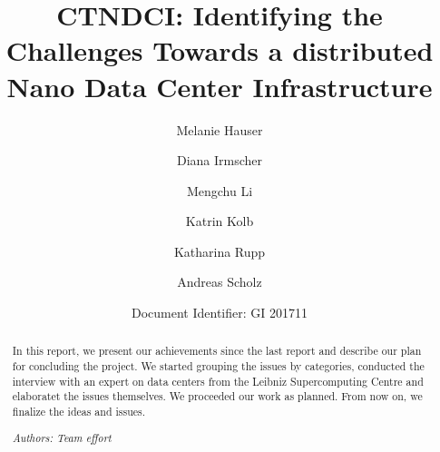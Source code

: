 \documentclass[sigchi-a, authorversion]{acmart}
\begin{document}
\title{CTNDCI: Identifying the Challenges Towards a distributed Nano Data Center Infrastructure}

\author{Melanie Hauser}

\author{Diana Irmscher} 

\author{Mengchu Li}

\author{Katrin Kolb}

\author{Katharina Rupp}

\author{Andreas Scholz}



\author{Document Identifier: GI 201711}
\renewcommand{\shortauthors}{Katrin Kolb et al.}

\begin{abstract}
In this report, we present our achievements since the last report and describe our plan for concluding the project. We started grouping the issues by categories, conducted the interview with an expert on data centers from the Leibniz Supercomputing Centre and elaboratet the issues themselves. We proceeded our work as planned. From now on, we finalize the ideas and issues. 



\textit{Authors: Team effort}\\
\end{abstract}


\maketitle
\end{document}
